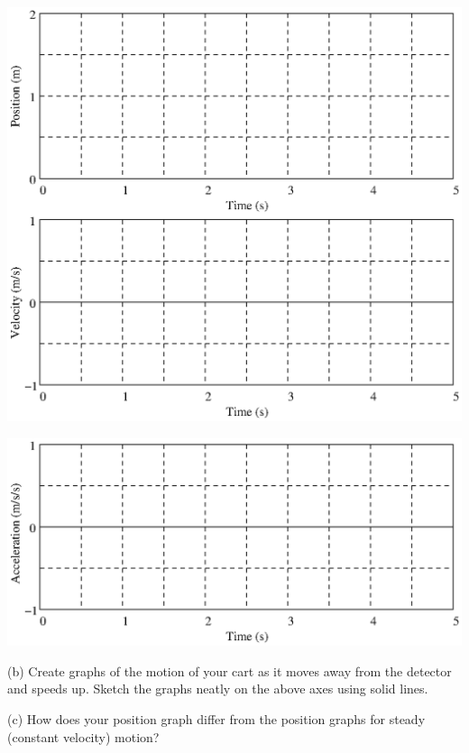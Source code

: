 \vspace{0.3cm}
{\par\centering \includegraphics{changing/changing_fig1.eps} \par}
\vspace{0.3cm}

\vspace{0.3cm}
{\par\centering \includegraphics{changing/changing_fig2.eps} \par}
\vspace{0.3cm}

(b) Create graphs of the motion of your cart as it moves away from the detector
and speeds up. Sketch the graphs neatly on the above axes using solid lines.

(c) How does your position graph differ from the position graphs for steady
(constant velocity) motion? 
\vspace{13mm}

